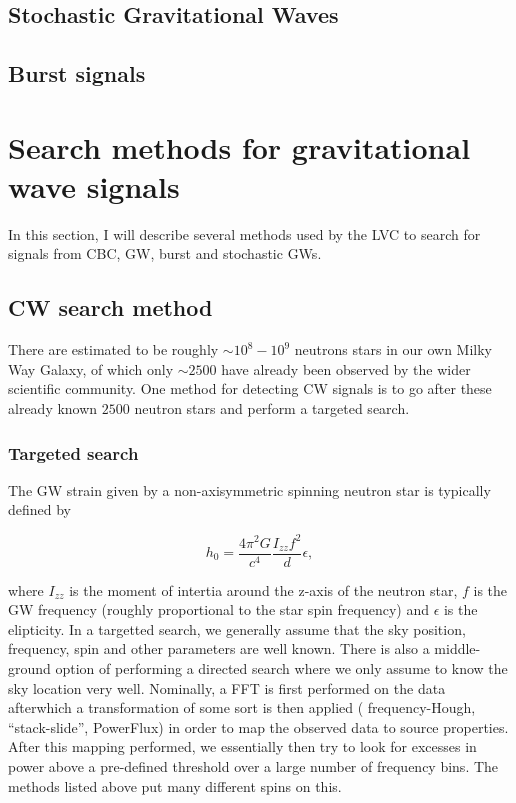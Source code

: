 \subsection{Stochastic Gravitational Waves}

\subsection{Burst signals}

\section{Search methods for gravitational wave signals}

In this section, I will describe several methods used by the 
\ac{LVC} to search for signals from \ac{CBC}, \ac{GW}, burst and 
stochastic \ac{GW}s.

\subsection{\ac{CW} search method}

There are estimated to be roughly $\sim 10^{8} - 10^{9}$ neutrons stars 
in our own Milky Way Galaxy, of which only $\sim 2500$ have already 
been observed by the wider scientific community. One method for detecting 
\ac{CW} signals is to go after these already known $2500$ neutron 
stars and perform a targeted search.

\subsubsection{Targeted search}
The GW strain given by a non-axisymmetric spinning neutron star 
is typically defined by 

\begin{equation}
    h_{0} = \frac{4\pi^2G}{c^4} \frac{I_{zz} f^2}{d} \epsilon,
\end{equation}

where $I_{zz}$ is the moment of intertia around the z-axis of the 
neutron star, $f$ is the \ac{GW} frequency (roughly proportional to 
the star spin frequency) and $\epsilon$ is the elipticity. In a targetted 
search, we generally assume that the sky position, frequency, spin and 
other parameters are well known. There is also a middle-ground option of 
performing a directed search where we only assume to know the sky location 
very well. Nominally, a \ac{FFT} is first performed on the 
data afterwhich a transformation of some sort is then applied (
frequency-Hough, ``stack-slide'', PowerFlux) in order to 
map the observed data to source properties. After this mapping performed, 
we essentially then try to look for excesses in power above 
a pre-defined threshold over a large number of frequency bins. The 
methods listed above put many different spins on this\cite{PhysRevD.90.042002}.

